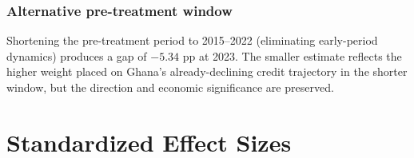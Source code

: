 \documentclass[12pt]{article}
\begin{document}
\subsubsection*{Alternative pre-treatment window} Shortening the pre-treatment period to 2015--2022 (eliminating early-period dynamics) produces a gap of $-5.34$ pp at 2023. The smaller estimate reflects the higher weight placed on Ghana's already-declining credit trajectory in the shorter window, but the direction and economic significance are preserved.

\section{Standardized Effect Sizes}
\label{sec:sde}


\end{document}
